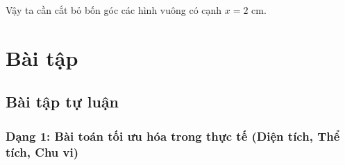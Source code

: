 \documentclass[12pt]{article}
\begin{document}
\begin{loigiai}
\begin{enumerate}[label=\textbf{B\arabic*.}]
			Vậy ta cần cắt bỏ bốn góc các hình vuông có cạnh $x = 2\text{ cm}$.
		\end{enumerate}
	\end{loigiai}
	
	\newpage
	
	\section{Bài tập}
	
	\subsection{Bài tập tự luận}
	\subsubsection{Dạng 1: Bài toán tối ưu hóa trong thực tế (Diện tích, Thể tích, Chu vi)}
	
\end{document}
